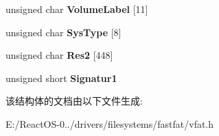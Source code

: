 \begin{DoxyCompactItemize}
unsigned char {\bfseries Volume\+Label} \mbox{[}11\mbox{]}
\item 
\mbox{\label{struct___boot_sector_af3ff7ced27b55bdce991be3e9f9b6249}} 
unsigned char {\bfseries Sys\+Type} \mbox{[}8\mbox{]}
\item 
\mbox{\label{struct___boot_sector_ab18ddb674687fb408238e1901b1a4e88}} 
unsigned char {\bfseries Res2} \mbox{[}448\mbox{]}
\item 
\mbox{\label{struct___boot_sector_a4c1d0f131bd87a25c0f4969a8bb04d67}} 
unsigned short {\bfseries Signatur1}
\end{DoxyCompactItemize}


该结构体的文档由以下文件生成\+:\begin{DoxyCompactItemize}
\item 
E\+:/\+React\+O\+S-\/0../drivers/filesystems/fastfat/vfat.\+h\end{DoxyCompactItemize}
